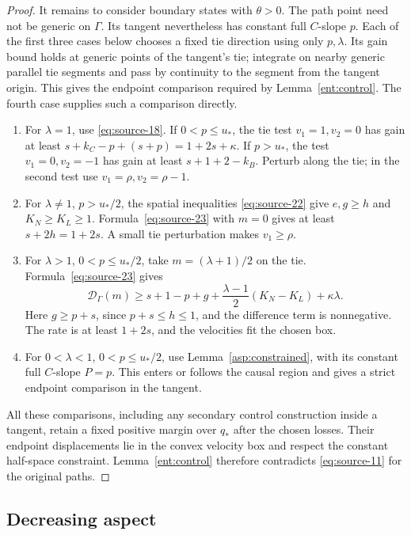 \begin{proof}
It remains to consider boundary states with \(\theta>0\). The path
point need not be generic on \(\Gamma\). Its tangent nevertheless has
constant full \(C\)-slope \(p\). Each of the first three cases below
chooses a fixed tie direction using only \(p,\lambda\). Its gain bound
holds at generic points of the tangent's tie; integrate on nearby
generic parallel tie segments and pass by continuity to the segment
from the tangent origin. This gives the endpoint comparison required
by Lemma~\ref{ent:control}. The fourth case supplies such a comparison
directly.
\begin{enumerate}[label=(\roman*)]
\item For \(\lambda=1\), use \eqref{eq:source-18}.
If \(0<p\le u_*\), the tie test \(v_1=1,v_2=0\)
has gain at least \(s+k_C-p+(s+p)=1+2s+\kappa\).
If \(p>u_*\), the test \(v_1=0,v_2=-1\) has
gain at least \(s+1+2-k_B\). Perturb along the tie;
in the second test use \(v_1=\rho,v_2=\rho-1\).
\item For \(\lambda\ne1\), \(p>u_*/2\), the spatial
inequalities \eqref{eq:source-22} give
\(e,g\ge h\) and \(K_N\ge K_L\ge1\).
Formula~\eqref{eq:source-23} with \(m=0\) gives
at least \(s+2h=1+2s\). A small tie perturbation makes
\(v_1\ge\rho\).
\item For \(\lambda>1\), \(0<p\le u_*/2\), take
\(m=(\lambda+1)/2\) on the tie. Formula~\eqref{eq:source-23}
gives
\[
\mathcal D_\Gamma(m)\ge
s+1-p+g+\frac{\lambda-1}{2}(K_N-K_L)+\kappa\lambda.
\]
Here \(g\ge p+s\), since \(p+s\le h\le1\), and
the difference term is nonnegative. The rate is at least
\(1+2s\), and the velocities fit the chosen box.
\item For \(0<\lambda<1\), \(0<p\le u_*/2\),
use Lemma~\ref{asp:constrained}, with its constant full
\(C\)-slope \(P=p\). This enters or follows the causal
region and gives a strict endpoint comparison in the tangent.
\end{enumerate}
All these comparisons, including any secondary control construction
inside a tangent, retain a fixed positive margin over \(q_*\)
after the chosen losses. Their endpoint displacements lie in the
convex velocity box and respect the constant half-space constraint.
Lemma~\ref{ent:control} therefore contradicts
\eqref{eq:source-11} for the original paths.
\end{proof}

\subsection{Decreasing aspect}

